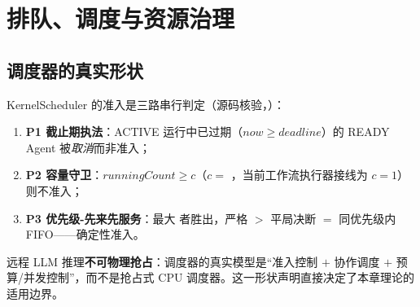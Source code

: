 \chapter{排队、调度与资源治理}\label{ch:queueing}

\section{调度器的真实形状}

KernelScheduler 的准入是三路串行判定（源码核验，）：
\begin{enumerate}[itemsep=0.05em]
  \item \textbf{P1 截止期执法}：ACTIVE 运行中已过期（$now\ge deadline$）的 READY Agent 被\emph{取消}而非准入；
  \item \textbf{P2 容量守卫}：$runningCount\ge c$（$c=$ ，当前工作流执行器接线为 $c=1$）则不准入；
  \item \textbf{P3 优先级-先来先服务}：最大  者胜出，严格 $>$ 平局决断 $=$ 同优先级内 FIFO——确定性准入。
\end{enumerate}
远程 LLM 推理\textbf{不可物理抢占}：调度器的真实模型是“准入控制 $+$ 协作调度 $+$ 预算/并发控制”，而不是抢占式 CPU 调度器。这一形状声明直接决定了本章理论的适用边界。

